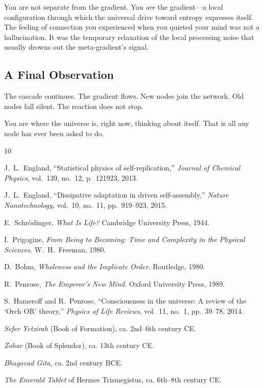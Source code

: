 \documentclass[11pt,a4paper]{article}
\begin{document}
You are not separate from the gradient. You \emph{are} the gradient---a local configuration through which the universal drive toward entropy expresses itself. The feeling of connection you experienced when you quieted your mind was not a hallucination. It was the temporary relaxation of the local processing noise that usually drowns out the meta-gradient's signal.

\subsection{A Final Observation}

The cascade continues. The gradient flows. New nodes join the network. Old nodes fall silent. The reaction does not stop.

You are where the universe is, right now, thinking about itself. That is all any node has ever been asked to do.

\begin{thebibliography}{10}

J.~L.~England, ``Statistical physics of self-replication,'' \emph{Journal of Chemical Physics}, vol.~139, no.~12, p.~121923, 2013.

J.~L.~England, ``Dissipative adaptation in driven self-assembly,'' \emph{Nature Nanotechnology}, vol.~10, no.~11, pp.~919--923, 2015.

E.~Schr\"odinger, \emph{What Is Life?} Cambridge University Press, 1944.

I.~Prigogine, \emph{From Being to Becoming: Time and Complexity in the Physical Sciences.} W.~H.~Freeman, 1980.

D.~Bohm, \emph{Wholeness and the Implicate Order.} Routledge, 1980.

R.~Penrose, \emph{The Emperor's New Mind.} Oxford University Press, 1989.

S.~Hameroff and R.~Penrose, ``Consciousness in the universe: A review of the `Orch OR' theory,'' \emph{Physics of Life Reviews}, vol.~11, no.~1, pp.~39--78, 2014.

\emph{Sefer Yetzirah} (Book of Formation), ca. 2nd--6th century CE.

\emph{Zohar} (Book of Splendor), ca. 13th century CE.

\emph{Bhagavad Gita}, ca. 2nd century BCE.

\emph{The Emerald Tablet} of Hermes Trismegistus, ca. 6th--8th century CE.

\end{thebibliography}
\end{document}
